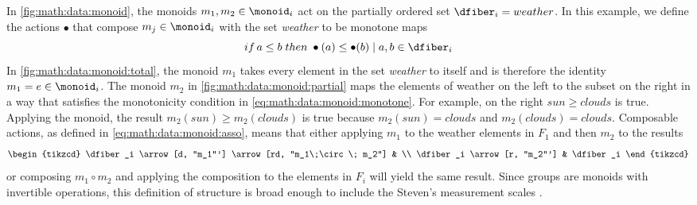 \documentclass[../main.tex]{subfiles}
\begin{document}
In \autoref{fig:math:data:monoid}, the monoids $m_1, m_2\in \monoid_i$ act on the partially ordered set $\dfiber_i=weather$. In this example, we define the actions $\bullet$ that compose $m_j \in \monoid_i$ with the set \textit{weather} to be monotone maps \cite{fongInvitationAppliedCategory2019}
\begin{equation*}
    \label{eq:math:data:monoid:monotone}
    if\, a \leq b \; then \; \bullet(a) \leq \bullet(b) \mid a,b \in \dfiber_{i}
\end{equation*}
In \autoref{fig:math:data:monoid:total}, the monoid $m_1$ takes every element in the set \textit{weather} to itself and is therefore the identity $m_1 = e \in \monoid_i$. The monoid $m_2$ in \autoref{fig:math:data:monoid:partial} maps the elements of weather on the left to the subset on the right in a way that satisfies the monotonicity condition in \autoref{eq:math:data:monoid:monotone}. For example, on the right $sun \geq clouds$ is true. Applying the monoid, the result  $m_2(sun) \geq m_2(clouds)$ is true because $m_2(sun)=clouds$ and $m_2(clouds)=clouds$. Composable actions, as defined in \autoref{eq:math:data:monoid:asso}, means that either applying $m_1$ to the weather elements in $F_1$ and then $m_2$ to the results
\begin{equation}
\begin{tikzcd}
    \dfiber_i \arrow[d, "m_1"'] \arrow[rd, "m_1\;\circ\; m_2"] &         \\
    \dfiber_i \arrow[r, "m_2"']                            & \dfiber_i
\end{tikzcd}
\end{equation}
or composing $m_1\circ m_2$ and applying the composition to the elements in $F_i$ will yield the same result. Since groups are monoids with invertible operations, this definition of structure is broad enough to include the Steven's measurement scales \cite{stevensTheoryScalesMeasurement1946,leaFormalizationMeasurementScale}.
\end{document}
